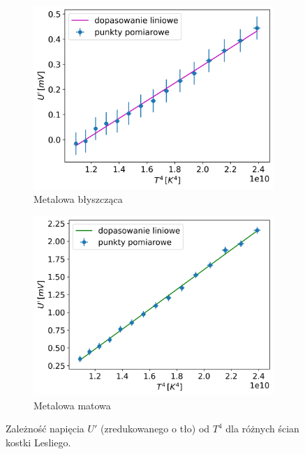 \documentclass[12pt]{article}
\begin{document}
\begin{figure}[H]
	\vspace{1em}

	\begin{subfigure}{0.45\textwidth}
		\centering
		\includegraphics[width=\linewidth]{cube_shining}
		\caption{Metalowa błyszcząca}
		\label{fig:cube_shining}
	\end{subfigure}
	\hfill
	\begin{subfigure}{0.45\textwidth}
		\centering
		\includegraphics[width=\linewidth]{cube_dull}
		\caption{Metalowa matowa}
		\label{fig:cube_dull}
	\end{subfigure}
	\caption{Zależność napięcia $U'$ (zredukowanego o tło) od $T^4$ dla różnych ścian kostki Lesliego.}
	\label{fig:cube_temp}
\end{figure}
\end{document}
